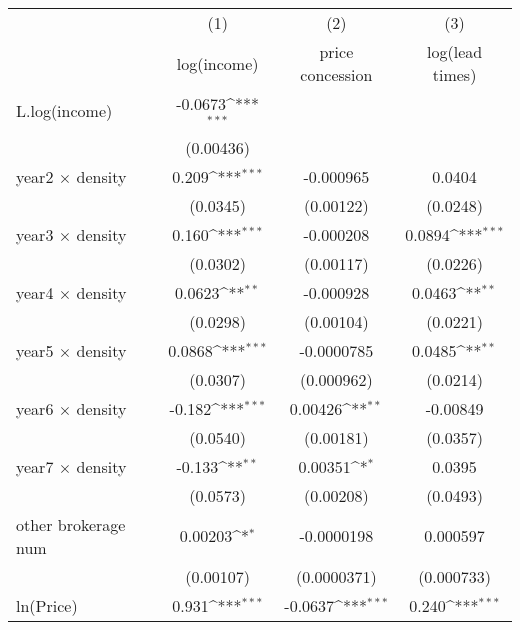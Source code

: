 {
\def\sym#1{\ifmmode^{#1}\else\(^{#1}\)\fi}
\begin{tabular}{l*{3}{c}}
\toprule
            &\multicolumn{1}{c}{(1)}&\multicolumn{1}{c}{(2)}&\multicolumn{1}{c}{(3)}\\
            &\multicolumn{1}{c}{log(income)}&\multicolumn{1}{c}{price concession}&\multicolumn{1}{c}{log(lead times)}\\
\midrule
L.log(income) &     -0.0673\sym{***}&                     &                     \\
            &   (0.00436)         &                     &                     \\
\addlinespace
year2 $\times$ density&       0.209\sym{***}&   -0.000965         &      0.0404         \\
            &    (0.0345)         &   (0.00122)         &    (0.0248)         \\
\addlinespace
year3 $\times$ density&       0.160\sym{***}&   -0.000208         &      0.0894\sym{***}\\
            &    (0.0302)         &   (0.00117)         &    (0.0226)         \\
\addlinespace
year4 $\times$ density&      0.0623\sym{**} &   -0.000928         &      0.0463\sym{**} \\
            &    (0.0298)         &   (0.00104)         &    (0.0221)         \\
\addlinespace
year5 $\times$ density&      0.0868\sym{***}&  -0.0000785         &      0.0485\sym{**} \\
            &    (0.0307)         &  (0.000962)         &    (0.0214)         \\
\addlinespace
year6 $\times$ density&      -0.182\sym{***}&     0.00426\sym{**} &    -0.00849         \\
            &    (0.0540)         &   (0.00181)         &    (0.0357)         \\
\addlinespace
year7 $\times$ density&      -0.133\sym{**} &     0.00351\sym{*}  &      0.0395         \\
            &    (0.0573)         &   (0.00208)         &    (0.0493)         \\
\addlinespace
other brokerage num  &     0.00203\sym{*}  &  -0.0000198         &    0.000597         \\
            &   (0.00107)         & (0.0000371)         &  (0.000733)         \\
\addlinespace
ln(Price)&       0.931\sym{***}&     -0.0637\sym{***}&       0.240\sym{***}\\

\end{tabular}}
